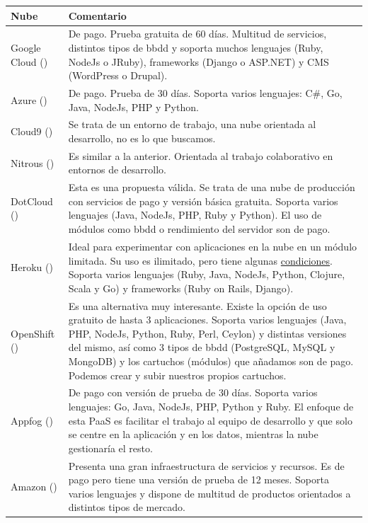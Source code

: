 \begin{table}[H]
	\centering
	\begin{tabular}{p{2cm} p{8cm}}
	\hline
	\textbf{Nube} & \textbf{Comentario} \\
	\hline \hline
	Google Cloud (\cite{URL:GoogleCloudPlatform}) & De pago. Prueba gratuita de 60 días. Multitud de servicios, distintos tipos de bbdd y soporta muchos lenguajes (Ruby, NodeJs o JRuby), frameworks (Django o ASP.NET) y CMS (WordPress o Drupal). \\
	\hline
	Azure (\cite{URL:Azure}) & De pago. Prueba de 30 días. Soporta varios lenguajes: C\#, Go, Java, NodeJs, PHP y Python. \\
	\hline
	Cloud9 (\cite{URL:Cloud9}) & Se trata de un entorno de trabajo, una nube orientada al desarrollo, no es lo que buscamos. \\
	\hline
	Nitrous (\cite{URL:Nitrous}) & Es similar a la anterior. Orientada al trabajo colaborativo en entornos de desarrollo. \\
	\hline
	DotCloud (\cite{URL:DotCloud}) & Esta es una propuesta válida. Se trata de una nube de producción con servicios de pago y versión básica gratuita. Soporta varios lenguajes (Java, NodeJs, PHP, Ruby y Python). El uso de módulos como bbdd o rendimiento del servidor son de pago. \\
	\hline
	Heroku (\cite{URL:Heroku}) & Ideal para experimentar con aplicaciones en la nube en un módulo limitada. Su uso es ilimitado, pero tiene algunas \href{https://www.heroku.com/pricing}{condiciones}. Soporta varios lenguajes (Ruby, Java, NodeJs, Python, Clojure, Scala y Go) y frameworks (Ruby on Rails, Django). \\
	\hline
	OpenShift (\cite{URL:OpenShift}) & Es una alternativa muy interesante. Existe la opción de uso gratuito de hasta 3 aplicaciones. Soporta varios lenguajes (Java, PHP, NodeJs, Python, Ruby, Perl, Ceylon) y distintas versiones del mismo, así como 3 tipos de bbdd (PostgreSQL, MySQL y MongoDB) y los cartuchos (módulos) que añadamos son de pago. Podemos crear y subir nuestros propios cartuchos. \\
	\hline
	Appfog (\cite{URL:Appfog}) & De pago con versión de prueba de 30 días. Soporta varios lenguajes: Go, Java, NodeJs, PHP, Python y Ruby. El enfoque de esta PaaS es facilitar el trabajo al equipo de desarrollo y que solo se centre en la aplicación y en los datos, mientras la nube gestionaría el resto. \\
	\hline
	Amazon (\cite{URL:Amazon}) & Presenta una gran infraestructura de servicios y recursos. Es de pago pero tiene una versión de prueba de 12 meses. Soporta varios lenguajes y dispone de multitud de productos orientados a distintos tipos de mercado. \\

\end{tabular}
\end{table}
